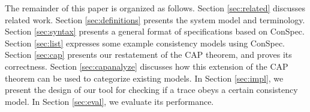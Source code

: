\documentclass[journal, compsoc]{IEEEtran}
\begin{document}
	
	The remainder of this paper is organized as follows. Section \ref{sec:related} discusses related work. Section  \ref{sec:definitions} presents the system model and terminology.  Section \ref{sec:syntax} presents a general format of specifications based on ConSpec. Section \ref{sec:list} expresses some example consistency models using ConSpec. %
	Section \ref{sec:cap} presents our restatement of the CAP theorem, %
	and proves its correctness.  Section \ref{sec:capanalyze} discusses how this extension of the CAP theorem can be used to categorize existing models. %
	In Section \ref{sec:impl}, we present the design of our tool for checking if a trace obeys a certain consistency model. In Section  \ref{sec:eval}, we evaluate its performance. 
	
	
	
\end{document}
